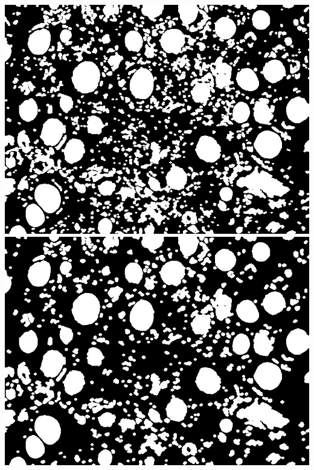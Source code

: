 \documentclass[a4paper]{article}
\begin{document}
\begin{minipage}{0.24\textwidth}
    \centering
    \includegraphics[width=\textwidth]{../code/task1/output/kernel_size_5.jpg}
    \includegraphics[width=\textwidth]{../code/task1/output/kernel_size_7.jpg}
\end{minipage}
\hfill
\end{document}
